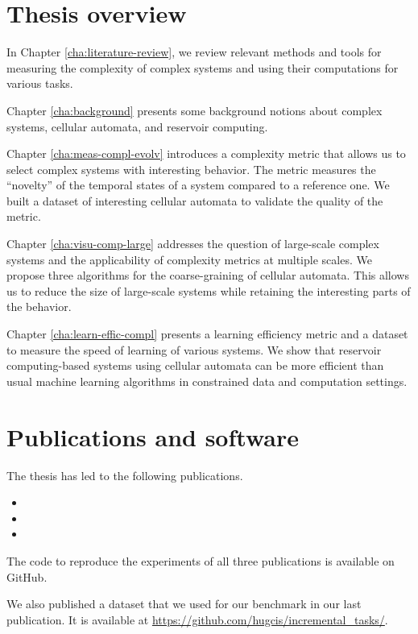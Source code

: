 \section{Thesis overview}

In Chapter \ref{cha:literature-review}, we review relevant methods and tools for
measuring the complexity of complex systems and using their computations for
various tasks.

Chapter \ref{cha:background} presents some background notions about complex
systems, cellular automata, and reservoir computing.

Chapter \ref{cha:meas-compl-evolv} introduces a complexity metric that allows us 
to select complex systems with interesting behavior. The metric measures the
``novelty'' of the temporal states of a system compared to a reference one. We
built a dataset of interesting cellular automata to validate the quality of the
metric.

Chapter \ref{cha:visu-comp-large} addresses the question of large-scale complex
systems and the applicability of complexity metrics at multiple scales. We
propose three algorithms for the coarse-graining of cellular automata. This allows
us to reduce the size of large-scale systems while retaining the interesting parts
of the behavior.

Chapter \ref{cha:learn-effic-compl} presents a learning efficiency metric and a
dataset to measure the speed of learning of various systems. We show that
reservoir computing-based systems using cellular automata can be more efficient
than usual machine learning algorithms in constrained data and computation
settings.


\section{Publications and software}

The thesis has led to the following publications.

\begin{itemize}
  \item {}
  \item {}
  \item {}
\end{itemize}

The code to reproduce the experiments of all three publications is available on
GitHub.

We also published a dataset that we used for our benchmark in our last
publication. It is available at
\url{https://github.com/hugcis/incremental_tasks/}.
